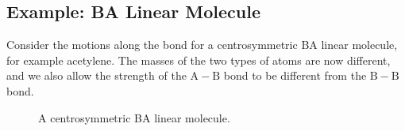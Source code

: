 \documentclass{article}
\theoremstyle{plain}\theoremheaderfont{\normalfont\itshape}\theorembodyfont{\rmfamily}\theoremseparator{.}\newtheorem*{rem}{Remark}\newtheorem*{ex}{Example}\newtheorem*{proof}{Proof}\newtheorem*{altp}{Alternative proof}
\theoremstyle{plain}\theoremheaderfont{\normalfont\bfseries}\theorembodyfont{\rmfamily}\theoremseparator{.}\newtheorem{thm}{Theorem}[section]\newtheorem{lem}[thm]{Lemma}\newtheorem{prop}[thm]{Proposition}\newtheorem*{cor}{Corollary}\newtheorem{defn}[thm]{Definition}\newtheorem{clm}[thm]{Claim}\newtheorem{clminproof}{Claim}
\theoremstyle{break}\theoremheaderfont{\normalfont\itshape}\theorembodyfont{\rmfamily}\theoremseparator{.\medskip}\newtheorem*{proofskip}{Proof}\newtheorem*{exs}{Examples}\newtheorem*{rems}{Remarks}
\theoremstyle{break}\theoremheaderfont{\normalfont\bfseries}\theorembodyfont{\rmfamily}\theoremseparator{.\medskip}\newtheorem{lemskip}[thm]{Lemma}\newtheorem{defnskip}[thm]{Definition}\newtheorem{propskip}[thm]{Proposition}\newtheorem{thmskip}[thm]{Theorem}
\numberwithin{equation}{section}
\newcommand{\vb}[1]{\bm{\mathrm{#1}}}
\renewcommand{\AA}{\mathrm{A}}
\newcommand{\BB}{\mathrm{B}}
\begin{document}
    \subsection{Example: \texorpdfstring{BA}{ABBA} Linear Molecule}
    Consider the motions along the bond for a centrosymmetric BA linear molecule, for example acetylene. The masses of the two types of atoms are now different, and we also allow the strength of the \(\mathrm{A-B}\) bond to be different from the \(\mathrm{B-B}\) bond.
    \begin{figure}[ht!]
        \centering
        \caption{A centrosymmetric BA linear molecule.}
    \end{figure}
\end{document}
